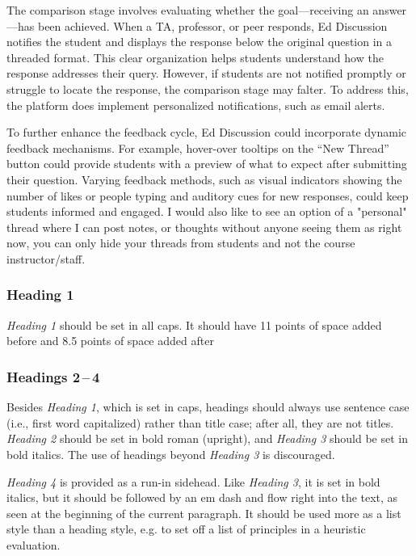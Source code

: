 \documentclass[
	letterpaper, %
]{jdf}
\begin{document}
The comparison stage involves evaluating whether the goal—receiving an answer—has been achieved. When a TA, professor, or peer responds, Ed Discussion notifies the student and displays the response below the original question in a threaded format. This clear organization helps students understand how the response addresses their query. However, if students are not notified promptly or struggle to locate the response, the comparison stage may falter. To address this, the platform does implement personalized notifications, such as email alerts.

To further enhance the feedback cycle, Ed Discussion could incorporate dynamic feedback mechanisms. For example, hover-over tooltips on the “New Thread” button could provide students with a preview of what to expect after submitting their question. Varying feedback methods, such as visual indicators showing the number of likes or people typing and auditory cues for new responses, could keep students informed and engaged. I would also like to see an option of a "personal" thread where I can post notes, or thoughts without anyone seeing them as right now, you can only hide your threads from students and not the course instructor/staff. 
\newpage

\subsubsection{Heading 1}
\emph{Heading 1} should be set in all caps. It should have 11 points of space added before and 8.5 points of space added after

\subsubsection{Headings 2\,–\,4}
Besides \emph{Heading 1}, which is set in caps, headings should always use sentence case (i.e., first word capitalized) rather than title case; after all, they are not titles. \emph{Heading 2} should be set in bold roman (upright), and \emph{Heading 3} should be set in bold italics. The use of headings beyond \emph{Heading 3} is discouraged.

\emph{Heading 4} is provided as a run-in sidehead. Like \emph{Heading 3}, it is set in bold italics, but it should be followed by an em dash and flow right into the text, as seen at the beginning of the current paragraph. It should be used more as a list style than a heading style, e.g. to set off a list of principles in a heuristic evaluation.
\end{document}
